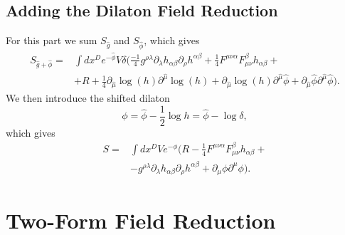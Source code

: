 \documentclass{article}
\begin{document}
\subsection{Adding the Dilaton Field Reduction}
For this part we sum $S_{\hat g}$ and $S_{\hat \phi}$, which gives
    \begin{equation*}
    \begin{aligned}
    S_{\hat g + \hat \phi} = &\int d x^D e^{-\hat \phi}V \delta \Big( 
    \frac{-1}{4} g^{\rho \lambda} \partial_\lambda h_{\alpha \beta}\partial_\rho h^{\alpha \beta}
    +\frac{1}{4}F^{\mu \nu \alpha}F^{\beta}_{\mu  \nu}h_{\alpha \beta}+\\
    &+ R + \frac{1}{4} \partial_{\hat \mu} \log(h) \partial^{\hat \mu} \log(h) + \partial_{\hat \mu} \log(h) \partial^{\hat \mu} \hat \phi + \partial_{\hat \mu} \hat \phi \partial^{\hat \mu} \hat \phi \Big).
\end{aligned}
\end{equation*}
We then introduce the shifted dilaton
\begin{equation}
    \phi = \hat \phi -\frac{1}{2} \log{h}= \hat \phi - \log{\delta},
\end{equation}
which gives
\begin{equation}
\boxed{
    \begin{aligned}
    S = &\int d x^D V e^{- \phi}\Big(
    R -\frac{1}{4}F^{\mu \nu \alpha}F^{\beta}_{\mu  \nu}h_{\alpha \beta}+\\
    &- g^{\rho \lambda} \partial_\lambda h_{\alpha \beta}\partial_\rho h^{\alpha \beta}
    + \partial_{ \mu}\phi\partial^{ \mu}\phi\Big).
\end{aligned}}
\end{equation} 
\section{Two-Form Field Reduction}
\end{document}
